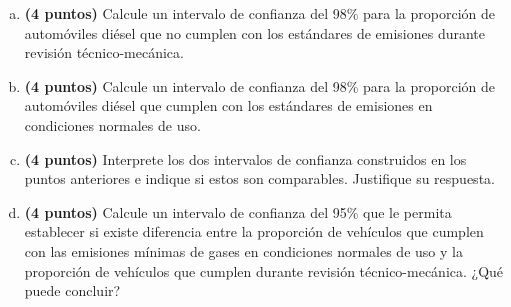 \documentclass[../main.tex]{subfiles}
\begin{document}
\begin{enumerate}[(a)]

\item \textbf{(4 puntos)} Calcule un intervalo de confianza del 98\% para la proporción de automóviles diésel que no cumplen con los estándares de emisiones durante revisión técnico-mecánica.

\item \textbf{(4 puntos)} Calcule un intervalo de confianza del 98\% para la proporción de automóviles diésel que cumplen con los estándares de emisiones en condiciones normales de uso.

\item \textbf{(4 puntos)} Interprete los dos intervalos de confianza construidos en los puntos anteriores e indique si estos son comparables. Justifique su respuesta.

\item \textbf{(4 puntos)} Calcule un intervalo de confianza del 95\% que le permita establecer si existe diferencia entre la proporción de vehículos que cumplen con las emisiones mínimas de gases en condiciones normales de uso y la proporción de vehículos que cumplen durante revisión
técnico-mecánica. ¿Qué puede concluir?

\end{enumerate}
\end{document}
